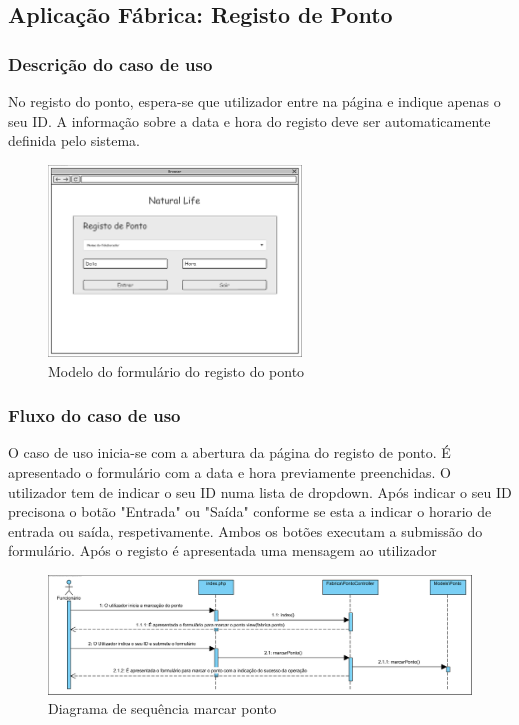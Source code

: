 \subsection{Aplicação Fábrica: Registo de Ponto}
\subsubsection*{Descrição do caso de uso}
No registo do ponto, espera-se que utilizador entre na página e indique apenas o seu ID. A informação sobre a data e hora do registo deve ser automaticamente definida pelo sistema. 

\begin{figure}[H] 
	\begin{center}
		\includegraphics[width=0.60\textwidth,keepaspectratio]{figuras/Diagramas_vp/DI_Fabrica_1-Marcar_Ponto.png}
		\caption{Modelo do formulário do registo do ponto}
		\label{fig:di_ponto} 
	\end{center}
\end{figure}

\subsubsection*{Fluxo do caso de uso}
O caso de uso inicia-se com a abertura da página do registo de ponto. É apresentado o formulário com a data e hora previamente preenchidas. O utilizador tem de indicar o seu ID numa lista de dropdown. Após indicar o seu ID precisona o botão "Entrada" ou "Saída" conforme se esta a indicar o horario de entrada ou saída, respetivamente. Ambos os botões executam a submissão do formulário. Após o registo é apresentada uma mensagem ao utilizador


\begin{figure}[H] 
	\begin{center}
		\includegraphics[width=\textwidth,keepaspectratio]{figuras/Diagramas_vp/SD_Fabrica_1-Marcar_Ponto.png}
		\caption{Diagrama de sequência marcar ponto}
		\label{fig:sd_ponto} 
	\end{center}
\end{figure}